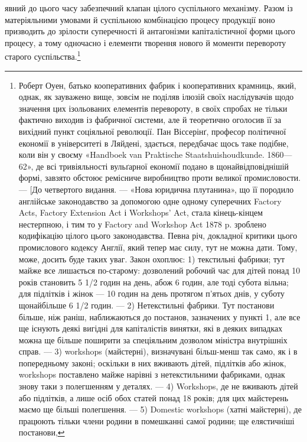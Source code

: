 \parcont{}  %
явний до цього часу забезпечний клапан цілого суспільного
механізму. Разом із матеріяльними умовами й суспільною комбінацією
процесу продукції воно призводить до зрілости суперечності
й антагонізми капіталістичної форми цього процесу,
а тому одночасно і елементи творення нового й моменти перевороту
старого суспільства.\footnote{
Роберт Оуен, батько кооперативних фабрик і кооперативних
крамниць, який, однак, як зауважено вище, зовсім не поділяв ілюзій
своїх наслідувачів щодо значення цих ізольованих елементів перевороту,
в своїх спробах не тільки фактично виходив із фабричної системи,
але й теоретично оголосив її за вихідний пункт соціяльної революції.
Пан Віссерінґ, професор політичної економії в університеті в Ляйдені,
здається, передбачає щось таке подібне, коли він у своєму «Handboek
van Praktische Staatshuishoudkunde. 1860—62», де всі тривіяльності
вульґарної економії подано в щонайвідповіднішій формі, завзято обстоює
ремісниче виробництво проти великої промисловости. — [До четвертого видання.
— «Нова юридична плутанина», що її породило англійське законодавство
за допомогою одне одному суперечних Factory Acts, Factory
Extension Act і Workshops’ Act, стала кінець-кінцем нестерпною, і
тим то у Factory and Workshop Act 1878 p. зроблено кодифікацію цілого
цього законодавства. Певна річ, докладної критики цього промислового
кодексу Англії, який тепер має силу, тут не можна дати. Тому, може,
досить буде таких уваг. Закон охоплює: 1) текстильні фабрики; тут
майже все лишається по-старому: дозволений робочий час для дітей
понад 10 років становить 5 1/2 годин на день, абож 6 годин, але тоді субота
вільна; для підлітків і жінок — 10 годин на день протягом п’ятьох
днів, у суботу щонайбільше 6 1/2 годин. — 2) Нетекстильні фабрики. Тут
постанови більше, ніж раніш, наближаються до постанов, зазначених у
пункті 1, але все ще існують деякі вигідні для капіталістів винятки, які
в деяких випадках можна ще більше поширити за спеціяльним дозволом
міністра внутрішніх справ. — 3) workshops (майстерні), визначувані
більш-менш так само, як і в попередньому законі; оскільки в них вживають
дітей, підлітків або жінок, workshops поставлено майже нарівні
з нетекстильними фабриками, однак знову таки з полегшенням у деталях.
— 4) Workshops, де не вживають дітей або підлітків, а лише осіб
обох статей понад 18 років; для цих майстерень маємо ще більші полегшення.
— 5) Domestic workshops (хатні майстерні), де працюють тільки
члени родини в помешканні самої родини; ще елястичніші постанови,
}
